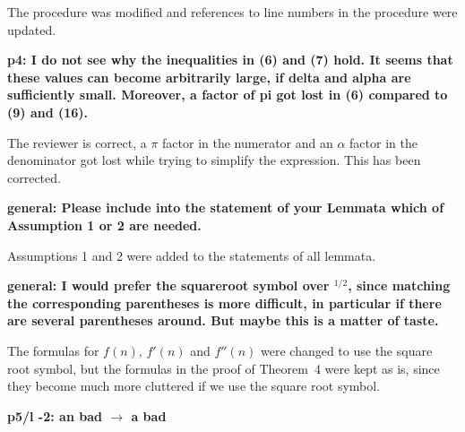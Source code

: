 \documentclass[lotsofwhite]{patmorin}
\newenvironment{comment}{\noindent\bf}{}
\newenvironment{response}{\noindent}{}
\begin{document}
\begin{response}
The procedure was modified and references to line numbers in the
procedure were updated.
\end{response}


\begin{comment}
p4: I do not see why the inequalities in (6) and (7) hold. It seems
that these values can become arbitrarily large, if delta and alpha are
sufficiently small. Moreover, a factor of pi got lost in (6) compared
to (9) and (16). 
\end{comment}

\begin{response}
The reviewer is correct, a $\pi$ factor in the numerator and an
$\alpha$ factor in the denominator got lost while trying to simplify
the expression.  This has been corrected.
\end{response}


\begin{comment}
general: Please include into the statement of your Lemmata which of
Assumption 1 or 2 are needed.
\end{comment}

\begin{response}
Assumptions 1 and 2 were added to the statements of all lemmata.
\end{response}

\begin{comment}
general: I would prefer the squareroot symbol over $^{1/2}$, since
matching the corresponding parentheses is more difficult, in
particular if there are several parentheses around. But maybe this is
a matter of taste.
\end{comment}

\begin{response}
The formulas for $f(n)$, $f'(n)$ and $f''(n)$ were changed to use the
square root symbol, but the formulas in the proof of Theorem~4 were
kept as is, since they become much more cluttered if we use the square
root symbol.
\end{response}


\begin{comment}
p5/l -2: an bad $\rightarrow$ a bad
\end{comment}
\end{document}
